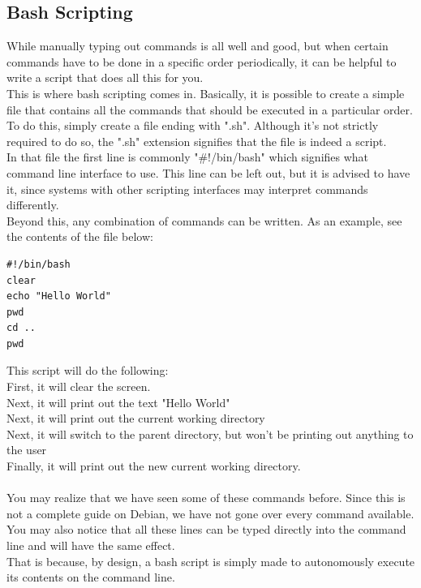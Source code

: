 \documentclass[12pt,article]{memoir}
\begin{document}
\newpage
\subsection{Bash Scripting}
While manually typing out commands is all well and good, but when certain commands have to be done in a specific order periodically, it can be helpful to write a script that does all this for you.\\
\noindent
This is where bash scripting comes in. Basically, it is possible to create a simple file that contains all the commands that should be executed in a particular order.\\
To do this, simply create a file ending with ".sh". Although it's not strictly required to do so, the ".sh" extension signifies that the file is indeed a script.\\
In that file the first line is commonly "\#!/bin/bash" which signifies what command line interface to use. This line can be left out, but it is advised to have it, since systems with other scripting interfaces may interpret commands differently.\\
Beyond this, any combination of commands can be written. As an example, see the contents of the file below:

\begin{lstlisting}
#!/bin/bash
clear
echo "Hello World"
pwd
cd ..
pwd
\end{lstlisting}
This script will do the following:\\
First, it will clear the screen.\\
Next, it will print out the text "Hello World"\\
Next, it will print out the current working directory\\
Next, it will switch to the parent directory, but won’t be printing out anything to the user\\
Finally, it will print out the new current working directory.\\\\

\noindent
You may realize that we have seen some of these commands before. Since this is not a complete guide on Debian, we have not gone over every command available.\\
You may also notice that all these lines can be typed directly into the command line and will have the same effect.\\
That is because, by design, a bash script is simply made to autonomously execute its contents on the command line.\\
\end{document}
